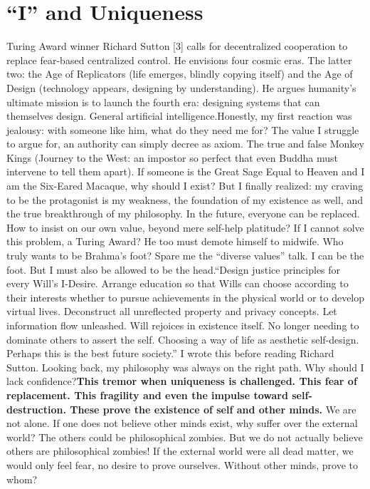 \documentclass[11pt]{article}
\renewcommand{\\}[1][\mynewlineskip]{\oldnewline[#1]}
\begin{document}
\section{``I'' and Uniqueness}
Turing Award winner Richard Sutton [3] calls for decentralized cooperation to replace fear-based centralized control. He envisions four cosmic eras. The latter two: the Age of Replicators (life emerges, blindly copying itself) and the Age of Design (technology appears, designing by understanding). He argues humanity's ultimate mission is to launch the fourth era: designing systems that can themselves design. General artificial intelligence.\\
Honestly, my first reaction was jealousy: with someone like him, what do they need me for? The value I struggle to argue for, an authority can simply decree as axiom. The true and false Monkey Kings (Journey to the West: an impostor so perfect that even Buddha must intervene to tell them apart). If someone is the Great Sage Equal to Heaven and I am the Six-Eared Macaque, why should I exist? \\
But I finally realized: my craving to be the protagonist is my weakness, the foundation of my existence as well, and the true breakthrough of my philosophy. In the future, everyone can be replaced. How to insist on our own value, beyond mere self-help platitude? If I cannot solve this problem, a Turing Award? He too must demote himself to midwife. Who truly wants to be Brahma's foot? Spare me the ``diverse values'' talk. I can be the foot. But I must also be allowed to be the head.\\
``Design justice principles for every Will's I-Desire. Arrange education so that Wills can choose according to their interests whether to pursue achievements in the physical world or to develop virtual lives. Deconstruct all unreflected property and privacy concepts. Let information flow unleashed. Will rejoices in existence itself. No longer needing to dominate others to assert the self. Choosing a way of life as aesthetic self-design. Perhaps this is the best future society.'' I wrote this before reading Richard Sutton. Looking back, my philosophy was always on the right path. Why should I lack confidence?\\
\textbf{This tremor when uniqueness is challenged. This fear of replacement. This fragility and even the impulse toward self-destruction. These prove the existence of self and other minds. }We are not alone. If one does not believe other minds exist, why suffer over the external world? The others could be philosophical zombies. But we do not actually believe others are philosophical zombies! If the external world were all dead matter, we would only feel fear, no desire to prove ourselves. Without other minds, prove to whom?\\
\end{document}
